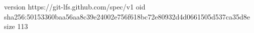 version https://git-lfs.github.com/spec/v1
oid sha256:50153360baa56aa8c39e24002e756f618bc72e80932d4d0661505d537ca35d8e
size 113
